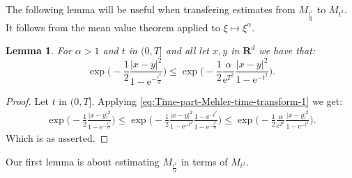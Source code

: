 \documentclass[a4paper,oneside,10pt]{amsproc}
\theoremstyle{plain}
\newtheorem{lemma}{Lemma}
\theoremstyle{remark}
\theoremstyle{definition}
\renewcommand{\leq}{\leqslant}
\renewcommand{\leq}{\leqslant}
\newcommand{\R}{\mathbf R}
\newcommand{\e}{\mathrm{e}} %
\renewcommand{\leq}{\leqslant}%
\begin{document}
The following lemma will be useful when transfering estimates from
$M_{\frac{t^2}{\alpha}}$ to $M_{t^2}$. It follows from the mean value
theorem applied to $\xi \mapsto \xi^\alpha$.
\begin{lemma}\label{lem:Exponential-estimates}
  For $\alpha > 1$ and $t$ in $(0, T]$ and all let $x, y$ in $\R^d$
  we have that:
  \begin{equation}
    \label{eq:Exponential-estimates-1}
    \exp \biggl (-\frac12\frac{|x - y|^2}{1 - \e^{-\frac{t^2}\alpha}}
    \biggr ) \leq  \exp \biggl (-\frac12\frac{\alpha}{\e^{T^2}} \frac{|x -
      y|^2}{1 - \e^{-t^2}} \biggr ).
  \end{equation}
\end{lemma}
\begin{proof}
  Let $t$ in $(0, T]$. Applying
  \eqref{eq:Time-part-Mehler-time-transform-1} we get:
  \begin{align*}
    \exp \biggl (-\frac12 \frac{|x - y|^2}{1 - \e^{-\frac{t^2}\alpha}} \biggr )
    \leq \exp \biggl (-\frac12 \frac{|x - y|^2}{1 - \e^{-t^2}} \frac{1 -
      \e^{-t^2}}{1 - \e^{-\frac{t^2}\alpha}} \biggr ) \leq \exp \biggl
    (-\frac12 \frac{\alpha}{\e^{T^2}} \frac{|x - y|^2}{1 - \e^{-t^2}} \biggr ).
  \end{align*}
  Which is as asserted.
\end{proof}
Our first lemma is about estimating $M_{\frac{t^2}\alpha}$ in terms of
$M_{t^2}$.
\end{document}
